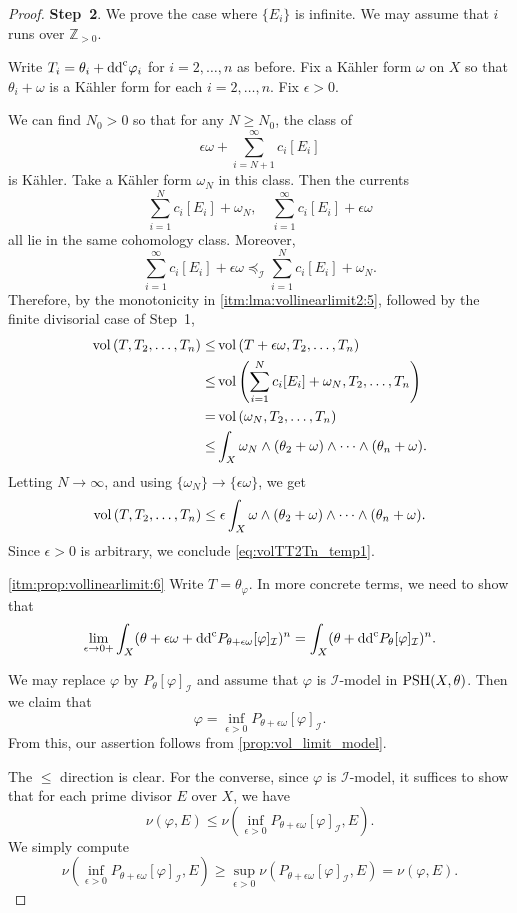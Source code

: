\begin{proof}
    \textbf{Step~2}. We prove the case where $\{E_i\}$ is infinite. We may assume that $i$ runs over $\mathbb{Z}_{>0}$.

    Write $T_i=\theta_{i}+\mathrm{dd}^{\mathrm{c}}\varphi_i$ for $i=2,\ldots,n$ as before.
    Fix a Kähler form $\omega$ on $X$ so that $\theta_i+\omega$ is a Kähler form for each $i=2,\ldots,n$. Fix $\epsilon>0$.

    We can find $N_0>0$ so that for any $N\geq N_0$, the class of
    \[
    \epsilon\omega+ \sum_{i=N+1}^{\infty}c_i[E_i]
    \]
    is Kähler. Take a Kähler form $\omega_N$ in this class.
    Then the currents
    \[
    \sum_{i=1}^N c_i [E_i]+\omega_N,\quad \sum_{i=1}^{\infty} c_i [E_i]+\epsilon\omega
    \]
    all lie in the same cohomology class.
    Moreover,
    \[
        \sum_{i=1}^{\infty} c_i [E_i]+\epsilon\omega\preceq_{\mathcal{I}}\sum_{i=1}^N c_i [E_i]+\omega_N.
    \]
    Therefore, by the monotonicity in \ref{itm:lma:vollinearlimit2:5}, followed by the finite divisorial case of Step~1,
    \[
    \begin{aligned}
    \operatorname{vol}\left(T,T_2,\ldots,T_n\right)\leq & \operatorname{vol}\left(T+\epsilon\omega,T_2,\ldots,T_n\right)\\
    \leq & \operatorname{vol}\left(\sum_{i=1}^N c_i [E_i]+\omega_N,T_2,\ldots,T_n\right)\\
    =&  \operatorname{vol}\left(\omega_N,T_2,\ldots,T_n\right)\\
    \leq & \int_X \omega_N\wedge (\theta_2+\omega)\wedge \cdots\wedge (\theta_n+\omega).
    \end{aligned}
    \]
    Letting $N\to\infty$, and using $\{\omega_N\}\to \{\epsilon\omega\}$, we get
    \[
    \operatorname{vol}\left(T,T_2,\ldots,T_n\right)\leq \epsilon \int_X \omega\wedge (\theta_2+\omega)\wedge \cdots\wedge (\theta_n+\omega).
    \]
    Since $\epsilon>0$ is arbitrary, we conclude \eqref{eq:volTT2Tn_temp1}.

    \ref{itm:prop:vollinearlimit:6} Write $T=\theta_{\varphi}$. In more concrete terms, we need to show that
    \[
    \lim_{\epsilon\to 0+}\int_X (\theta+\epsilon\omega+\mathrm{dd}^{\mathrm{c}} P_{\theta+\epsilon\omega}[\varphi]_{\mathcal{I}})^n=\int_X (\theta+\mathrm{dd}^{\mathrm{c}} P_{\theta}[\varphi]_{\mathcal{I}})^n.
    \]

    We may replace $\varphi$ by $P_{\theta}[\varphi]_{\mathcal{I}}$ and assume that $\varphi$ is $\mathcal{I}$-model in $\mathrm{PSH}(X,\theta)$. Then we claim that
    \[
    \varphi=\inf_{\epsilon>0}P_{\theta+\epsilon\omega}[\varphi]_{\mathcal{I}}.
    \]
    From this, our assertion follows from \cref{prop:vol_limit_model}.

    The $\leq$ direction is clear. For the converse, since $\varphi$ is $\mathcal{I}$-model, it suffices to show that for each prime divisor $E$ over $X$, we have
    \[
    \nu(\varphi,E)\leq \nu\left(\inf_{\epsilon>0}P_{\theta+\epsilon\omega}[\varphi]_{\mathcal{I}},E\right).
    \]
    We simply compute
    \[
    \nu\left(\inf_{\epsilon>0}P_{\theta+\epsilon\omega}[\varphi]_{\mathcal{I}},E\right)\geq \sup_{\epsilon>0}\nu\left(P_{\theta+\epsilon\omega}[\varphi]_{\mathcal{I}},E\right)=\nu(\varphi,E).
    \]
\end{proof}



